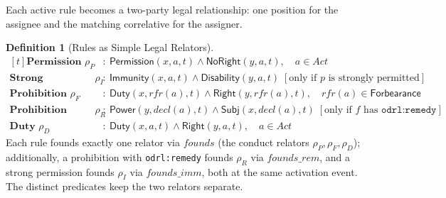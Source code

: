 \documentclass{IOS-Book-Article}
\newcommand{\PermPos}{\mathsf{Permission}}   %
\newcommand{\Duty}{\mathsf{Duty}}            %
\newcommand{\Right}{\mathsf{Right}}          %
\newcommand{\NoRight}{\mathsf{NoRight}}      %
\newcommand{\Power}{\mathsf{Power}}          %
\newcommand{\Disability}{\mathsf{Disability}} %
\newcommand{\Immunity}{\mathsf{Immunity}}
\newcommand{\Subj}{\mathsf{Subj}}       %
\newcommand{\Forbearance}{\mathsf{Forbearance}}
\newcommand{\odrl}[1]{\texttt{odrl:#1}}
\theoremstyle{definition}
\newtheorem{definition}{Definition}[section]
\begin{document}
\noindent Each active rule becomes a two-party legal relationship: one
position for the assignee and the matching correlative for the assigner.
\begin{definition}[Rules as Simple Legal Relators]
\label{def:rule-relator}
\[
\begin{aligned}[t]
\textbf{Permission } \rho_P &:~
\PermPos(x,a,t)\land\NoRight(y,a,t),
\quad a\in\mathit{Act}\\
\textbf{Strong permission } \rho_I &:~
\Immunity(x,a,t)\land\Disability(y,a,t)
\;[\text{only if } p \text{ is strongly permitted}]\\
\textbf{Prohibition } \rho_F &:~
\Duty(x,\mathit{rfr}(a),t)\land\Right(y,\mathit{rfr}(a),t),
\quad \mathit{rfr}(a)\in\Forbearance\\
\textbf{Prohibition remedy } \rho_R &:~
\Power(y,\mathit{decl}(a),t)\land\Subj(x,\mathit{decl}(a),t)
\;[\text{only if } f \text{ has }\odrl{remedy}]\\
\textbf{Duty } \rho_D &:~
\Duty(x,a,t)\land\Right(y,a,t),
\quad a\in\mathit{Act}
\end{aligned}
\]
Each rule founds exactly one relator via $\mathit{founds}$ (the conduct relators
$\rho_P,\rho_F,\rho_D$); additionally, a prohibition with \odrl{remedy} founds
$\rho_R$ via $\mathit{founds\_rem}$, and a strong permission founds $\rho_I$ via $\mathit{founds\_imm}$, both at the same activation event. The distinct
predicates keep the two relators separate.
\end{definition}
\noindent
\end{document}
